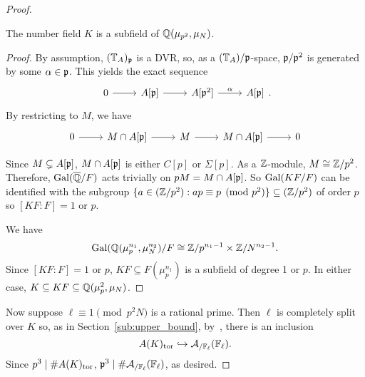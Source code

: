 \documentclass[thesis.tex]{subfiles}
\begin{document}
\begin{proof}
    \begin{lemma}
        The number field $K$ is a subfield of $\mathbb{Q}(\mu_{p^2}, \mu_N)$.
    \end{lemma}
    \begin{proof}
        By assumption, $(\mathbb{T}_A)_{\mathfrak{p}}$ is a DVR\@, so, as a $(\mathbb{T}_A)/\mathfrak{p}$-space,
        $\mathfrak{p}/\mathfrak{p}^2$ is generated by some $\alpha\in \mathfrak{p}$. This yields the exact
        sequence
        \[
            \begin{tikzcd}
                0 \arrow[r] &
                A[\p] \arrow[r] &
                A[\p^2] \arrow[r, "\alpha"] &
                A[\p]
            \end{tikzcd}.
        \]
        By restricting to $M$, we have
        \begin{equation}
            \label{eq:M_Ap}
            \begin{tikzcd}
                0 \arrow[r] &
                M\cap A[\p] \arrow[r] &
                M \arrow[r] &
                M\cap A[\p] \arrow[r] &
                0
            \end{tikzcd} 
        \end{equation}

        Since $M\subsetneq A[\mathfrak{p}]$, $M\cap A[\mathfrak{p}]$ is either $C[p]$ or
        $\Sigma[p]$. As a $\mathbb{Z}$-module, $M\cong \mathbb{Z}/p^2$. Therefore,
        $\operatorname{Gal}(\overline{\mathbb{Q}}/F)$ acts trivially on $pM=M\cap A[\mathfrak{p}]$. So $\operatorname{Gal}(KF/F)$
        can be identified with the subgroup $\{a\in (\mathbb{Z}/p^2):ap\equiv p
        \pmod{p^2}\}\subseteq (\mathbb{Z}/p^2)$ of order $p$ so $[KF:F]=1$ or $p$.

        We have 
        \[
            \operatorname{Gal}(\mathbb{Q}(\mu_p ^{n_1}, \mu_N ^{n_2})/F \cong \mathbb{Z}/p^{n_1-1} \times
            \mathbb{Z}/N^{n_2-1}.
        \]
        Since $[KF:F]=1$ or $p$, $KF\subseteq F(\mu_p ^{n_1})$ is a subfield of
        degree 1 or $p$. In either case, $K\subseteq KF \subseteq \mathbb{Q}(\mu_p ^2,
        \mu_N)$.
    \end{proof}

    Now suppose $\ell\equiv 1\pmod{p^2 N}$ is a rational prime. Then $\ell$ is
    completely split over $K$ so, as in Section~\ref{sub:upper_bound},
    by~\cite[Appendix]{katz:torsion}, there is an inclusion
    \[
        A(K)_{\mathrm{tor}}\hookrightarrow \mathcal{A}_{/\mathbb{F}_\ell}(\mathbb{F}_\ell).
    \]
    Since $p^3\mid \#A(K)_{\mathrm{tor}}$, $\mathfrak{p}^3\mid \#\mathcal{A}_{/\mathbb{F}_\ell}(\mathbb{F}_\ell)$,
    as desired.
\end{proof}
\end{document}
